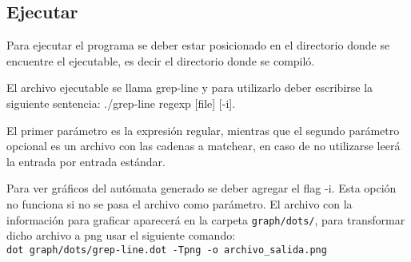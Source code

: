 \subsection{Ejecutar}

Para ejecutar el programa se deber estar posicionado en el directorio donde 
se encuentre el ejecutable, es decir el directorio donde se compiló.

El archivo ejecutable se llama grep-line y para utilizarlo deber escribirse 
la siguiente sentencia: ./grep-line regexp [file] [-i].

El primer parámetro es la expresión regular, mientras que el segundo parámetro 
opcional es un archivo con las cadenas a matchear, en caso de no utilizarse 
leerá la entrada por entrada estándar.

Para ver gráficos del autómata generado se deber agregar el flag -i. Esta opción
no funciona si no se pasa el archivo como parámetro. El archivo con la información
para graficar aparecerá en la carpeta \texttt{graph/dots/}, para transformar dicho
archivo a png usar el siguiente comando: \\
\texttt{dot graph/dots/grep-line.dot -Tpng -o archivo\_salida.png}
